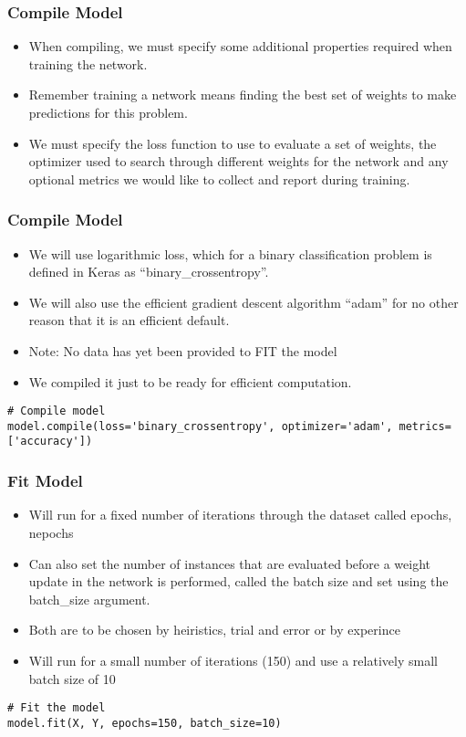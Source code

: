 \begin{frame}[fragile] \frametitle{Compile Model}
 \begin{itemize}
\item  When compiling, we must specify some additional properties required when training the network. 
\item Remember training a network means finding the best set of weights to make predictions for this problem.
\item We must specify the loss function to use to evaluate a set of weights, the optimizer used to search through different weights for the network and any optional metrics we would like to collect and report during training.
\end{itemize}
\end{frame}

\begin{frame}[fragile] \frametitle{Compile Model}
 \begin{itemize}
\item We will use logarithmic loss, which for a binary classification problem is defined in Keras as ``binary\_crossentropy''. 
\item We will also use the efficient gradient descent algorithm ``adam'' for no other reason that it is an efficient default. 
\item Note: No data has yet been provided to FIT the model
\item We compiled it just to be ready for efficient computation.
\end{itemize}
\begin{lstlisting}
# Compile model
model.compile(loss='binary_crossentropy', optimizer='adam', metrics=['accuracy'])
\end{lstlisting}
\end{frame}

\begin{frame}[fragile] \frametitle{Fit Model}
 \begin{itemize}
\item Will run for a fixed number of iterations through the dataset called epochs, nepochs
\item Can also set the number of instances that are evaluated before a weight update in the network is performed, called the batch size and set using the batch\_size argument.
\item Both are to be chosen by heiristics, trial and error or by experince
\item Will run for a small number of iterations (150) and use a relatively small batch size of 10
\end{itemize}
\begin{lstlisting}
# Fit the model
model.fit(X, Y, epochs=150, batch_size=10)
\end{lstlisting}
\end{frame}


